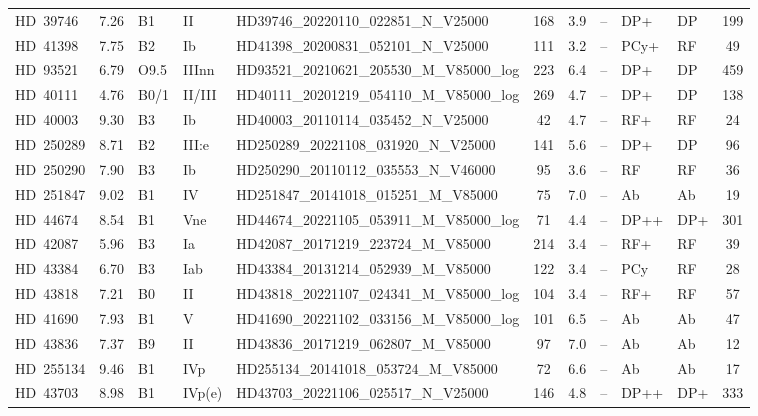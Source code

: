 {\begin{landscape}
\begin{longtable}{lclllcclllc}
\noalign{\smallskip}
HD~39746 & 7.26 & B1 & II & HD39746\_20220110\_022851\_N\_V25000 & 168 & 3.9 & -- & DP+ & DP & 199 \\
\noalign{\smallskip}
HD~41398 & 7.75 & B2 & Ib & HD41398\_20200831\_052101\_N\_V25000 & 111 & 3.2 & -- & PCy+ & RF & 49 \\
\noalign{\smallskip}
HD~93521 & 6.79 & O9.5 & IIInn & HD93521\_20210621\_205530\_M\_V85000\_log & 223 & 6.4 & -- & DP+ & DP & 459 \\
\noalign{\smallskip}
HD~40111 & 4.76 & B0/1 & II/III & HD40111\_20201219\_054110\_M\_V85000\_log & 269 & 4.7 & -- & DP+ & DP & 138 \\
\noalign{\smallskip}
HD~40003 & 9.30 & B3 & Ib & HD40003\_20110114\_035452\_N\_V25000 & 42 & 4.7 & -- & RF+ & RF & 24 \\
\noalign{\smallskip}
HD~250289 & 8.71 & B2 & III:e & HD250289\_20221108\_031920\_N\_V25000 & 141 & 5.6 & -- & DP+ & DP & 96 \\
\noalign{\smallskip}
HD~250290 & 7.90 & B3 & Ib & HD250290\_20110112\_035553\_N\_V46000 & 95 & 3.6 & -- & RF & RF & 36 \\
\noalign{\smallskip}
HD~251847 & 9.02 & B1 & IV & HD251847\_20141018\_015251\_M\_V85000 & 75 & 7.0 & -- & Ab & Ab & 19 \\
\noalign{\smallskip}
HD~44674 & 8.54 & B1 & Vne & HD44674\_20221105\_053911\_M\_V85000\_log & 71 & 4.4 & -- & DP++ & DP+ & 301 \\
\noalign{\smallskip}
HD~42087 & 5.96 & B3 & Ia & HD42087\_20171219\_223724\_M\_V85000 & 214 & 3.4 & -- & RF+ & RF & 39 \\
\noalign{\smallskip}
HD~43384 & 6.70 & B3 & Iab & HD43384\_20131214\_052939\_M\_V85000 & 122 & 3.4 & -- & PCy & RF & 28 \\
\noalign{\smallskip}
HD~43818 & 7.21 & B0 & II & HD43818\_20221107\_024341\_M\_V85000\_log & 104 & 3.4 & -- & RF+ & RF & 57 \\
\noalign{\smallskip}
HD~41690 & 7.93 & B1 & V & HD41690\_20221102\_033156\_M\_V85000\_log & 101 & 6.5 & -- & Ab & Ab & 47 \\
\noalign{\smallskip}
HD~43836 & 7.37 & B9 & II & HD43836\_20171219\_062807\_M\_V85000 & 97 & 7.0 & -- & Ab & Ab & 12 \\
\noalign{\smallskip}
HD~255134 & 9.46 & B1 & IVp & HD255134\_20141018\_053724\_M\_V85000 & 72 & 6.6 & -- & Ab & Ab & 17 \\
\noalign{\smallskip}
HD~43703 & 8.98 & B1 & IVp(e) & HD43703\_20221106\_025517\_N\_V25000 & 146 & 4.8 & -- & DP++ & DP+ & 333 \\

\end{longtable}
\end{landscape}}
